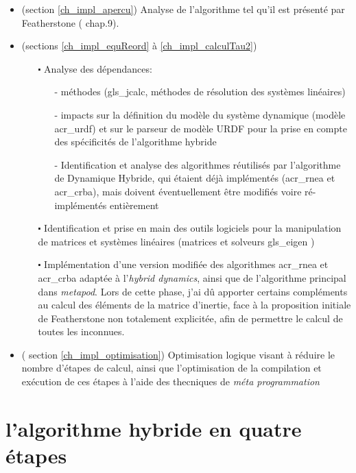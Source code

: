 \documentclass{report}
\begin{document}
\begin{itemize}
\item (section \ref{ch_impl_apercu}) Analyse de l'algorithme tel qu'il est présenté par Featherstone (\cite{bib_featherstone} chap.9).
\item (sections \ref{ch_impl_equReord} à \ref{ch_impl_calculTau2})
  \begin{itemize}
  \item[$\centerdot$] Analyse des dépendances:
  \begin{itemize}
    \item[-] méthodes (\gls{gls_jcalc}, méthodes de résolution des systèmes linéaires)
    \item[-] impacts sur la définition du modèle du système dynamique (modèle \gls{acr_urdf}) et sur le parseur de modèle URDF pour la prise en compte des spécificités de l'algorithme hybride
    \item[-] Identification et analyse des algorithmes réutilisés par l'algorithme de Dynamique Hybride, qui étaient déjà implémentés (\gls{acr_rnea} et \gls{acr_crba}), mais doivent éventuellement être modifiés voire ré-implémentés entièrement
  \end{itemize}
  \item[$\centerdot$] Identification et prise en main des outils logiciels pour la manipulation de matrices et systèmes linéaires (matrices et solveurs \gls{gls_eigen} \cite{bib_eigen_tutorial_alg_lin})
  \item[$\centerdot$] Implémentation d'une version modifiée des algorithmes \gls{acr_rnea} et \gls{acr_crba} adaptée à l'\emph{hybrid dynamics}, ainsi que de l'algorithme principal dans \emph{metapod}. Lors de cette phase, j'ai dû apporter certains compléments au calcul des éléments de la matrice d'inertie, face à la proposition initiale de Featherstone non totalement explicitée, afin de permettre le calcul de toutes les inconnues.
  \end{itemize}
\item ( section \ref{ch_impl_optimisation}) Optimisation logique visant à réduire le nombre d'étapes de calcul, ainsi que l'optimisation de la compilation et exécution de ces étapes à l'aide des thecniques de \emph{méta programmation}
\end{itemize}


\section{l'algorithme hybride en quatre étapes}
\end{document}

